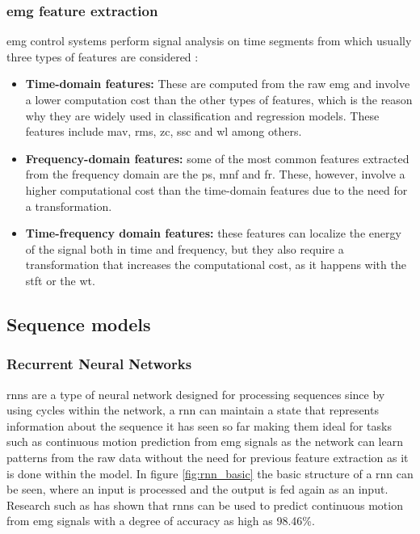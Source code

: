 \subsubsection{\acrshort{emg} feature extraction}

\acrshort{emg} control systems perform signal analysis on time segments from which usually three types of features are considered \cite{EMGprediction}:
\begin{itemize}
    \item \textbf{Time-domain features:} These are computed from the raw \acrshort{emg} and involve a lower computation cost than the other types of features,
    which is the reason why they are widely used in classification and regression models. These features include \acrfull{mav}, \acrfull{rms}, \acrfull{zc}, \acrfull{ssc} and \acrfull{wl}
    among others.
    \item \textbf{Frequency-domain features:} some of the most common features extracted from the frequency domain are the \acrfull{ps}, \acrfull{mnf} and \acrfull{fr}.
    These, however, involve a higher computational cost than the time-domain features due to the need for a transformation.
    \item \textbf{Time-frequency domain features:} these features can localize the energy of the signal both in time and frequency, but they also
    require a transformation that increases the computational cost, as it happens with the \acrfull{stft} or the \acrfull{wt}.
\end{itemize}


\subsection{Sequence models}

\subsubsection{Recurrent Neural Networks}
\acp{rnn} are a type of neural network designed for processing sequences since by using cycles within the network, a \acrshort{rnn} can maintain a state that
represents information about the sequence it has seen so far \cite{RNNdef} making them ideal for tasks such as continuous motion prediction from \acrshort{emg} signals
as the network can learn patterns from the raw data without the need for previous feature extraction as it is done within the model.
In figure \ref{fig:rnn_basic} the basic structure of a \acrshort{rnn} can be seen, where an input is processed and the output is fed again as an input.
Research such as \cite{RNNEMG} has shown that \acp{rnn} can be used to predict continuous motion from \acrshort{emg} signals with a degree of 
accuracy as high as 98.46\%.

